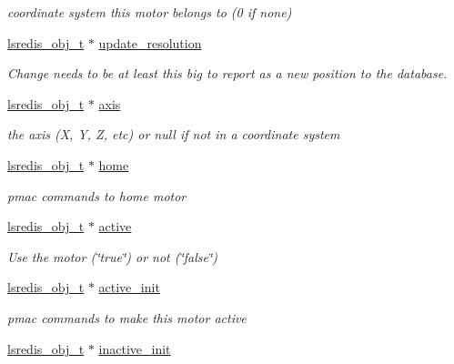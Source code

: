 \begin{DoxyCompactItemize}
\begin{DoxyCompactList}\small\item\em coordinate system this motor belongs to (0 if none) \end{DoxyCompactList}\item 
\hyperlink{pgpmac_8h_ad449de06d02791adf2498d2a1e1f909c}{lsredis\-\_\-obj\-\_\-t} $\ast$ \hyperlink{structlspmac__motor__struct_aefa84c7592369090eec8b211caaa3a51}{update\-\_\-resolution}
\begin{DoxyCompactList}\small\item\em Change needs to be at least this big to report as a new position to the database. \end{DoxyCompactList}\item 
\hyperlink{pgpmac_8h_ad449de06d02791adf2498d2a1e1f909c}{lsredis\-\_\-obj\-\_\-t} $\ast$ \hyperlink{structlspmac__motor__struct_a7437ef16c2dce65bde4dda1ea00e9df3}{axis}
\begin{DoxyCompactList}\small\item\em the axis (X, Y, Z, etc) or null if not in a coordinate system \end{DoxyCompactList}\item 
\hyperlink{pgpmac_8h_ad449de06d02791adf2498d2a1e1f909c}{lsredis\-\_\-obj\-\_\-t} $\ast$ \hyperlink{structlspmac__motor__struct_a6dc1ceab86687f741d4c4a574501959c}{home}
\begin{DoxyCompactList}\small\item\em pmac commands to home motor \end{DoxyCompactList}\item 
\hyperlink{pgpmac_8h_ad449de06d02791adf2498d2a1e1f909c}{lsredis\-\_\-obj\-\_\-t} $\ast$ \hyperlink{structlspmac__motor__struct_aed4998885bcd5a2a30069637180f58e3}{active}
\begin{DoxyCompactList}\small\item\em Use the motor (\char`\"{}true\char`\"{}) or not (\char`\"{}false\char`\"{}) \end{DoxyCompactList}\item 
\hyperlink{pgpmac_8h_ad449de06d02791adf2498d2a1e1f909c}{lsredis\-\_\-obj\-\_\-t} $\ast$ \hyperlink{structlspmac__motor__struct_ac2a02f137e4a35db816bc728290d3558}{active\-\_\-init}
\begin{DoxyCompactList}\small\item\em pmac commands to make this motor active \end{DoxyCompactList}\item 
\hyperlink{pgpmac_8h_ad449de06d02791adf2498d2a1e1f909c}{lsredis\-\_\-obj\-\_\-t} $\ast$ \hyperlink{structlspmac__motor__struct_ab329ce9b277eca9984c18417dece7bf7}{inactive\-\_\-init}

\end{DoxyCompactItemize}

